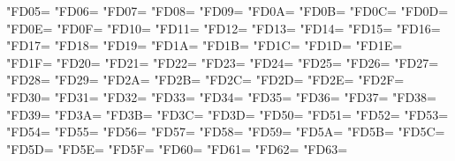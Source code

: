 \XeTeXcharclass"FD05=\KclassArabU
\XeTeXcharclass"FD06=\KclassArabU
\XeTeXcharclass"FD07=\KclassArabU
\XeTeXcharclass"FD08=\KclassArabU
\XeTeXcharclass"FD09=\KclassArabU
\XeTeXcharclass"FD0A=\KclassArabU
\XeTeXcharclass"FD0B=\KclassArabU
\XeTeXcharclass"FD0C=\KclassArabU
\XeTeXcharclass"FD0D=\KclassArabU
\XeTeXcharclass"FD0E=\KclassArabU
\XeTeXcharclass"FD0F=\KclassArabU
\XeTeXcharclass"FD10=\KclassArabU
\XeTeXcharclass"FD11=\KclassArabU
\XeTeXcharclass"FD12=\KclassArabU
\XeTeXcharclass"FD13=\KclassArabU
\XeTeXcharclass"FD14=\KclassArabU
\XeTeXcharclass"FD15=\KclassArabU
\XeTeXcharclass"FD16=\KclassArabU
\XeTeXcharclass"FD17=\KclassArabU
\XeTeXcharclass"FD18=\KclassArabU
\XeTeXcharclass"FD19=\KclassArabU
\XeTeXcharclass"FD1A=\KclassArabU
\XeTeXcharclass"FD1B=\KclassArabU
\XeTeXcharclass"FD1C=\KclassArabU
\XeTeXcharclass"FD1D=\KclassArabU
\XeTeXcharclass"FD1E=\KclassArabU
\XeTeXcharclass"FD1F=\KclassArabU
\XeTeXcharclass"FD20=\KclassArabU
\XeTeXcharclass"FD21=\KclassArabU
\XeTeXcharclass"FD22=\KclassArabU
\XeTeXcharclass"FD23=\KclassArabU
\XeTeXcharclass"FD24=\KclassArabU
\XeTeXcharclass"FD25=\KclassArabU
\XeTeXcharclass"FD26=\KclassArabU
\XeTeXcharclass"FD27=\KclassArabU
\XeTeXcharclass"FD28=\KclassArabU
\XeTeXcharclass"FD29=\KclassArabU
\XeTeXcharclass"FD2A=\KclassArabU
\XeTeXcharclass"FD2B=\KclassArabU
\XeTeXcharclass"FD2C=\KclassArabU
\XeTeXcharclass"FD2D=\KclassArabU
\XeTeXcharclass"FD2E=\KclassArabU
\XeTeXcharclass"FD2F=\KclassArabU
\XeTeXcharclass"FD30=\KclassArabU
\XeTeXcharclass"FD31=\KclassArabU
\XeTeXcharclass"FD32=\KclassArabU
\XeTeXcharclass"FD33=\KclassArabU
\XeTeXcharclass"FD34=\KclassArabU
\XeTeXcharclass"FD35=\KclassArabU
\XeTeXcharclass"FD36=\KclassArabU
\XeTeXcharclass"FD37=\KclassArabU
\XeTeXcharclass"FD38=\KclassArabU
\XeTeXcharclass"FD39=\KclassArabU
\XeTeXcharclass"FD3A=\KclassArabU
\XeTeXcharclass"FD3B=\KclassArabU
\XeTeXcharclass"FD3C=\KclassArabU
\XeTeXcharclass"FD3D=\KclassArabU
\XeTeXcharclass"FD50=\KclassArabU
\XeTeXcharclass"FD51=\KclassArabU
\XeTeXcharclass"FD52=\KclassArabU
\XeTeXcharclass"FD53=\KclassArabU
\XeTeXcharclass"FD54=\KclassArabU
\XeTeXcharclass"FD55=\KclassArabU
\XeTeXcharclass"FD56=\KclassArabU
\XeTeXcharclass"FD57=\KclassArabU
\XeTeXcharclass"FD58=\KclassArabU
\XeTeXcharclass"FD59=\KclassArabU
\XeTeXcharclass"FD5A=\KclassArabU
\XeTeXcharclass"FD5B=\KclassArabU
\XeTeXcharclass"FD5C=\KclassArabU
\XeTeXcharclass"FD5D=\KclassArabU
\XeTeXcharclass"FD5E=\KclassArabU
\XeTeXcharclass"FD5F=\KclassArabU
\XeTeXcharclass"FD60=\KclassArabU
\XeTeXcharclass"FD61=\KclassArabU
\XeTeXcharclass"FD62=\KclassArabU
\XeTeXcharclass"FD63=\KclassArabU
